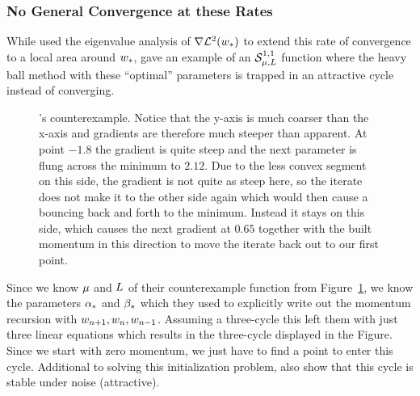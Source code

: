 \subsubsection{No General Convergence at these Rates}

While
\textcite[pp. 65-67]{polyakIntroductionOptimization1987} used the eigenvalue
analysis of \(\nabla\mathcal{L}^2(w_*)\) to extend this rate of convergence
to a local area around \(w_*\), \textcite[pp. 78-79]{lessardAnalysisDesignOptimization2016}
gave an example of an \(\mathcal{S}^{1,1}_{{\mu},{L}}\) function where
the heavy ball method with these ``optimal'' parameters is trapped in an attractive
cycle instead of converging. 
%
\begin{figure}[h]
	\centering
	\def\svgwidth{1\textwidth}
	
	\caption{
		\citeauthor{lessardAnalysisDesignOptimization2016}'s counterexample.
		Notice that the y-axis is much coarser than the x-axis and gradients are
		therefore much steeper than apparent. At point \(-1.8\) the gradient is
		quite steep and the next parameter is flung across the minimum to
		\(2.12\). Due to the less convex segment on this side, the gradient is
		not quite as steep here, so the iterate does not make it to the other
		side again which would then cause a bouncing back and forth to the
		minimum. Instead it stays on this side, which causes the next gradient
		at \(0.65\) together with the built momentum in this direction to move the
		iterate back out to our first point.
	}
	\label{fig: heavy ball counterexample}
\end{figure}

Since we know \(\mu\) and \(L\) of their counterexample function from
Figure~\ref{fig: heavy ball counterexample}, we know the parameters \(\alpha_*\)
and \(\beta_*\) which they used to explicitly write out the momentum recursion
with \(w_{n+1}, w_{n}, w_{n-1}\). Assuming a three-cycle
this left them with just three linear equations which results in the three-cycle
displayed in the Figure. Since we start with zero momentum, we just have to
find a point to enter this cycle. Additional to solving this initialization
problem, \textcite[pp. 93-94]{lessardAnalysisDesignOptimization2016} also show
that this cycle is stable under noise (attractive).

